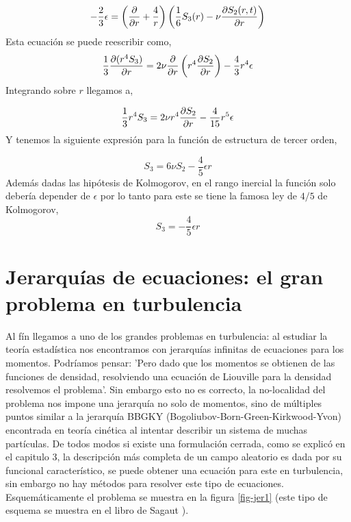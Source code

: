 \documentclass[executivepaper,12pt]{article}
\numberwithin{equation}{section}
\begin{document}
\begin{equation*}
	-\frac{2}{3}\epsilon=\left(\pdv{}{r}+\frac{4}{r}\right)\left(\frac{1}{6}S_3(r)-\nu\pdv{S_2(r,t)}{r}\right)
\end{equation*}
Esta ecuación se puede reescribir como,
\begin{equation*}
	\frac{1}{3}\pdv{(r^4 S_3)}{r}=2\nu\pdv{}{r}\left(r^4 \pdv{S_2}{r}\right)-\frac{4}{3}r^4\epsilon
\end{equation*}
Integrando sobre $r$ llegamos a,

\begin{equation*}
	\frac{1}{3}r^4 S_3 =2\nu r^4 \pdv{S_2}{r}-\frac{4}{15}r^5\epsilon
\end{equation*}
Y tenemos la siguiente expresión para la función de estructura de tercer orden, 

\begin{equation*}
	S_3=6\nu S_2-\frac{4}{5}\epsilon r
\end{equation*}
Además dadas las hipótesis de Kolmogorov, en el rango inercial la función solo debería depender de $\epsilon$ por lo tanto para este se tiene la famosa ley de $4/5$ de Kolmogorov,
\begin{equation*}
	S_3=-\frac{4}{5}\epsilon r
\end{equation*}

\pagebreak 
\section{Jerarquías de ecuaciones: el gran problema en turbulencia}

Al fín llegamos a uno de los grandes problemas en turbulencia: al estudiar la teoría estadística nos encontramos con jerarquías infinitas de ecuaciones para los momentos. Podríamos pensar: 'Pero dado que los momentos se obtienen de las funciones de densidad, resolviendo una ecuación de Liouville para la densidad resolvemos el problema'. Sin embargo esto no es correcto, la no-localidad del problema nos impone una jerarquía no solo de momentos, sino de múltiples puntos similar a la jerarquía BBGKY (Bogoliubov-Born-Green-Kirkwood-Yvon) encontrada en teoría cinética al intentar describir un sistema de muchas partículas. De todos modos si existe una formulación cerrada, como se explicó en el capitulo 3, la descripción más completa de un campo aleatorio es dada por su funcional característico, se puede obtener una ecuación para este en turbulencia, sin embargo no hay métodos para resolver este tipo de ecuaciones. Esquemáticamente el problema se muestra en la figura \ref{fig-jer1} (este tipo de esquema se muestra en el libro de Sagaut \parencite{sagaut2008}).
\end{document}
